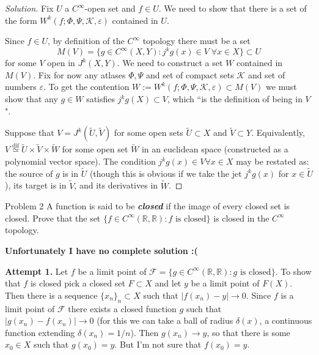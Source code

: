 \begin{proof}[Solution]\leavevmode
Fix \(U\) a \(C^\infty\)-open set and  \(f \in U\). We need to show that there is a set of the form \(W^k(f;\Phi,\Psi,\mathcal{K},\varepsilon)\) contained in \(U\).

Since \(f \in U\), by definition of the \(C^\infty\) topology there must be a set
\[M(V)=\{g \in C^\infty(X,Y): j^kg(x) \in V \;\forall x \in X\} \subset U\]
for some  \(V\) open in \(J^k(X,Y)\). We need to construct a set \(W\) contained in \(M(V)\). Fix for now any atlases  \(\Phi,\Psi\) and set of compact sets \(\mathcal{K}\) and set of numbers \(\varepsilon\). To get the contention \(W:=W^k(f;\Phi,\Psi,\mathcal{K},\varepsilon)\subset M(V)\) we must show that any \(g \in W\) satisfies \(j^kg(X) \subset V\), which ``is the definition of being in \(V\)".

Suppose that \(V= J^k(\tilde{U},\tilde{V})\) for some open sets \(\tilde{U} \subset X\) and \(\tilde{V} \subset Y\). Equivalently, \(V\overset{\operatorname{dif}}{\simeq}\tilde{U} \times \tilde{V} \times \tilde{W}\) for some open set \(\tilde{W}\) in an euclidean space (constructed as a polynomial vector space). The condition \(j^kg(x) \in V \forall  x \in X\) may be restated as: the source of \(g\) is in \(\tilde{U}\) (though this is obvious if we take the jet \(j^kg(x)\) for \(x \in \tilde{U}\)), its target is in \(\tilde{V}\), and its derivatives in \(\tilde{W}\).

\end{proof}
\fi
\begin{thing1}{Problem 2}\label{p:2}\leavevmode
A function is said to be \textit{\textbf{closed}} if the image of every closed set is closed. Prove that the set \(\{f \in C^\infty(\mathbb{R},\mathbb{R}): f \text{ is closed} \}\) is closed in the \(C^\infty\) topology.
\end{thing1}

\textbf{Unfortunately I have no complete solution :(}

\textbf{Attempt 1.} \hspace{.5em} 
	Let \(f \) be a limit point of \(\mathcal{F}=\{g\in C^\infty(\mathbb{R},\mathbb{R}):g\text{ is closed} \}\). To show that \(f\) is closed pick a closed set \(F \subset X\) and let \(y\) be a limit point of  \(F(X)\). Then there is a sequence \(\{x_n\}_n \subset X\) such that \(|f(x_n)-y| \to 0\). Since \(f\) is a limit point of \(\mathcal{F}\) there exists a closed function \(g\) such that \(|g(x_n)-f(x_n)|\to 0\) (for this we can take a ball of radius \(\delta(x)\), a continuous function extending \(\delta(x_n)=1/n\)). Then \(g(x_n) \to y\), so that there is some \(x_0 \in X\) such that \(g(x_0)=y\). But I'm not sure that \(f(x_0)=y\).

